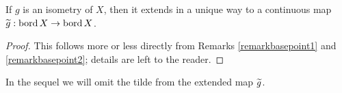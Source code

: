 \begin{lemma}
\label{lemmaisometryextension}
If $g$ is an isometry of $X$, then it extends in a unique way to a continuous map $\widetilde g:\operatorname{bord} X\to\operatorname{bord} X$.
\end{lemma}
\begin{proof}
This follows more or less directly from Remarks \ref{remarkbasepoint1} and \ref{remarkbasepoint2}; details are left to the reader.
\end{proof}
%
In the sequel we will omit the tilde from the extended map $\widetilde g$.



